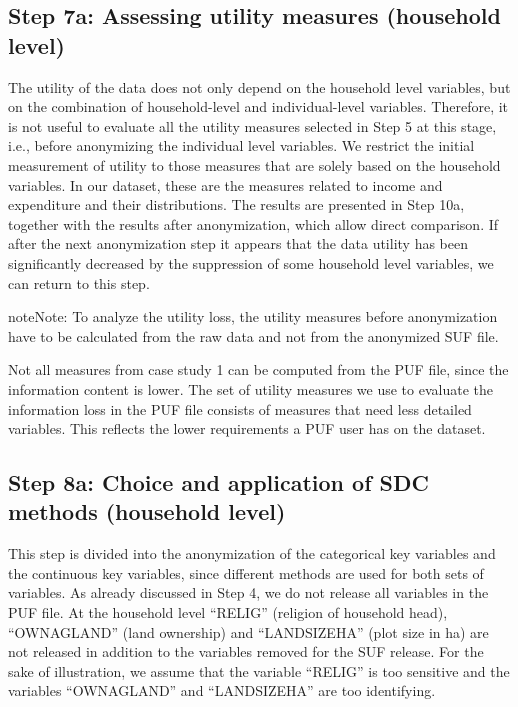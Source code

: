 \documentclass[letterpaper,10pt,english]{sphinxmanual}
\begin{document}
\subsection{Step 7a: Assessing utility measures (household level)}
\label{\detokenize{case_studies:id10}}
The utility of the data does not only depend on the household level
variables, but on the combination of household-level and
individual-level variables. Therefore, it is not useful to evaluate all
the utility measures selected in Step 5 at this stage, i.e., before
anonymizing the individual level variables. We restrict the initial
measurement of utility to those measures that are solely based on the
household variables. In our dataset, these are the measures related to
income and expenditure and their distributions. The results are
presented in Step 10a, together with the results after anonymization,
which allow direct comparison. If after the next anonymization step it
appears that the data utility has been significantly decreased by the
suppression of some household level variables, we can return to this
step.

\begin{sphinxadmonition}{note}{Note:}
To analyze the utility loss, the utility measures before
anonymization have to be calculated from the raw data and not from the
anonymized SUF file.
\end{sphinxadmonition}

Not all measures from case study 1 can be
computed from the PUF file, since the information content is lower. The
set of utility measures we use to evaluate the information loss in the
PUF file consists of measures that need less detailed variables. This
reflects the lower requirements a PUF user has on the dataset.


\subsection{Step 8a: Choice and application of SDC methods (household level)}
\label{\detokenize{case_studies:step-8a-choice-and-application-of-sdc-methods-household-level}}
This step is divided into the anonymization of the categorical key
variables and the continuous key variables, since different methods are
used for both sets of variables. As already discussed in Step 4, we do
not release all variables in the PUF file. At the household level
“RELIG” (religion of household head), “OWNAGLAND” (land ownership) and
“LANDSIZEHA” (plot size in ha) are not released in addition to the
variables removed for the SUF release. For the sake of illustration, we
assume that the variable “RELIG” is too sensitive and the variables
“OWNAGLAND” and “LANDSIZEHA” are too identifying.
\end{document}
